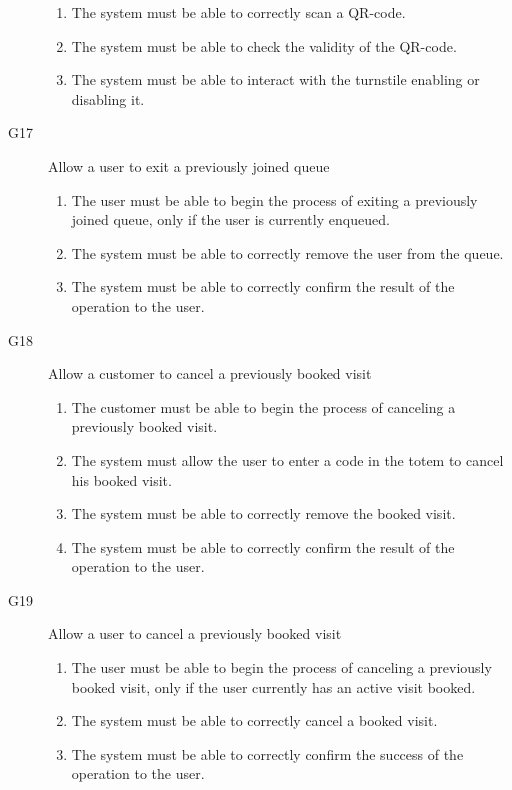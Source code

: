 \begin{description}
\begin{enumerate}[resume*]
            \item The system must be able to correctly scan a QR-code.
            \item The system must be able to check the validity of the QR-code.
            \item The system must be able to interact with the turnstile enabling or disabling it.
        \end{enumerate}
    \item [G17] Allow a user to exit a previously joined queue
        \begin{enumerate}[resume*]
            \item The user must be able to begin the process of exiting a previously joined queue, only if the user is currently enqueued.
            \item The system must be able to correctly remove the user from the queue.
            \item The system must be able to correctly confirm the result of the operation to the user.
        \end{enumerate}
    \item [G18] Allow a customer to cancel a previously booked visit
        \begin{enumerate}[resume*]
            \item The customer must be able to begin the process of canceling a previously booked visit.
            \item The system must allow the user to enter a code in the totem to cancel his booked visit.
            \item The system must be able to correctly remove the booked visit.
            \item The system must be able to correctly confirm the result of the operation to the user.
        \end{enumerate}
    \item [G19] Allow a user to cancel a previously booked visit
        \begin{enumerate}[resume*]
            \item The user must be able to begin the process of canceling a previously booked visit, only if the user currently has an active visit booked.
            \item The system must be able to correctly cancel a booked visit.
            \item The system must be able to correctly confirm the success of the operation to the user.
        \end{enumerate}
\end{description}

